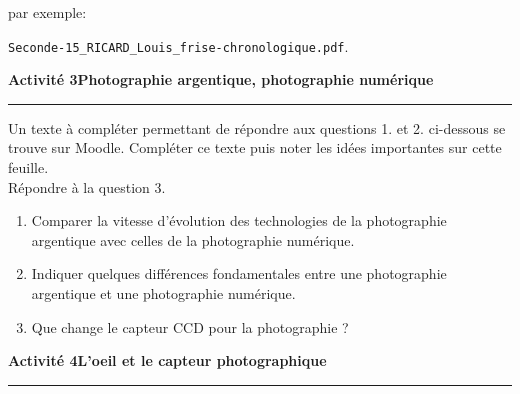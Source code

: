 \documentclass[a4paper]{article}
\begin{document}
par exemple:

\begin{center}
  \verb|Seconde-15_RICARD_Louis_frise-chronologique.pdf|.
\end{center}

\bigskip

\noindent\textbf{Activité 3}\hfill{}\textbf{Photographie argentique, photographie numérique}
\smallskip
\hrule
\medskip

Un texte à compléter permettant de répondre aux questions 1. et 2. ci-dessous se trouve sur Moodle. Compléter ce texte puis noter les idées importantes sur cette feuille.\\
Répondre à la question 3.

\begin{enumerate}
  \item Comparer la vitesse d'évolution des technologies de la photographie argentique avec celles de la photographie numérique.
  \item Indiquer quelques différences fondamentales entre une photographie argentique et une photographie numérique.
  \item Que change le capteur CCD pour la photographie ?
\end{enumerate}

\bigskip


\noindent\textbf{Activité 4}\hfill{}\textbf{L'oeil et le capteur photographique}
\smallskip
\hrule
\medskip
\end{document}

